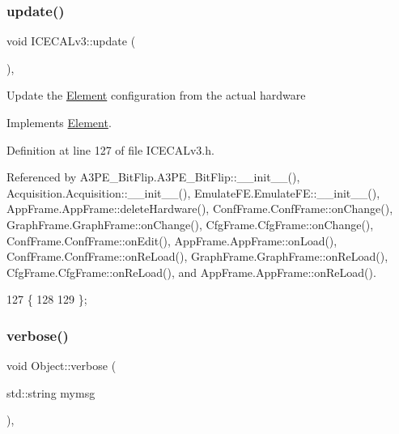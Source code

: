 \subsubsection{\texorpdfstring{update()}{update()}}
{\footnotesize\ttfamily void I\+C\+E\+C\+A\+Lv3\+::update (\begin{DoxyParamCaption}{ }\end{DoxyParamCaption})\hspace{0.3cm}{\ttfamily [inline]}, {\ttfamily [virtual]}}

Update the \hyperlink{classElement}{Element} configuration from the actual hardware 

Implements \hyperlink{classElement_a4e6c83efae95616ebddd03c793a26661}{Element}.



Definition at line 127 of file I\+C\+E\+C\+A\+Lv3.\+h.



Referenced by A3\+P\+E\+\_\+\+Bit\+Flip.\+A3\+P\+E\+\_\+\+Bit\+Flip\+::\+\_\+\+\_\+init\+\_\+\+\_\+(), Acquisition.\+Acquisition\+::\+\_\+\+\_\+init\+\_\+\+\_\+(), Emulate\+F\+E.\+Emulate\+F\+E\+::\+\_\+\+\_\+init\+\_\+\+\_\+(), App\+Frame.\+App\+Frame\+::delete\+Hardware(), Conf\+Frame.\+Conf\+Frame\+::on\+Change(), Graph\+Frame.\+Graph\+Frame\+::on\+Change(), Cfg\+Frame.\+Cfg\+Frame\+::on\+Change(), Conf\+Frame.\+Conf\+Frame\+::on\+Edit(), App\+Frame.\+App\+Frame\+::on\+Load(), Conf\+Frame.\+Conf\+Frame\+::on\+Re\+Load(), Graph\+Frame.\+Graph\+Frame\+::on\+Re\+Load(), Cfg\+Frame.\+Cfg\+Frame\+::on\+Re\+Load(), and App\+Frame.\+App\+Frame\+::on\+Re\+Load().


\begin{DoxyCode}
127                  \{
128     
129   \};
\end{DoxyCode}
\mbox{\label{classObject_a83d2db2df682907ea1115ad721c1c4a1}} 
\subsubsection{\texorpdfstring{verbose()}{verbose()}\hspace{0.1cm}{\footnotesize\ttfamily [1/2]}}
{\footnotesize\ttfamily void Object\+::verbose (\begin{DoxyParamCaption}\item[{std\+::string}]{mymsg }\end{DoxyParamCaption})\hspace{0.3cm}{\ttfamily [inline]}, {\ttfamily [inherited]}}



